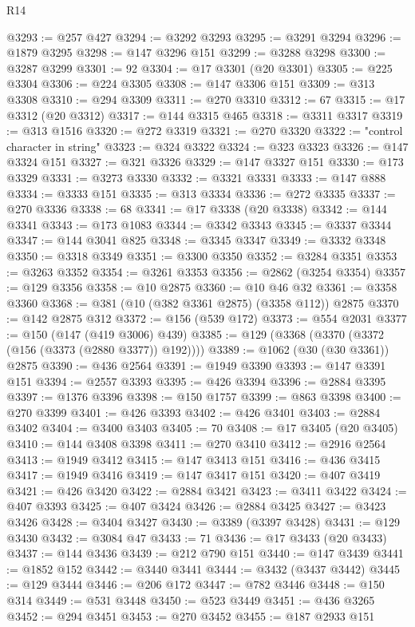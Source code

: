 \begin{lexlean}{R14}
\begin{coremodule}
@3293 := @257 @427
@3294 := @3292 @3293
@3295 := @3291 @3294
@3296 := @1879 @3295
@3298 := @147 @3296 @151
@3299 := @3288 @3298
@3300 := @3287 @3299
@3301 := 92
@3304 := @17 @3301 (@20 @3301)
@3305 := @225 @3304
@3306 := @224 @3305
@3308 := @147 @3306 @151
@3309 := @313 @3308
@3310 := @294 @3309
@3311 := @270 @3310
@3312 := 67
@3315 := @17 @3312 (@20 @3312)
@3317 := @144 @3315 @465
@3318 := @3311 @3317
@3319 := @313 @1516
@3320 := @272 @3319
@3321 := @270 @3320
@3322 := "control character in string"
@3323 := @324 @3322
@3324 := @323 @3323
@3326 := @147 @3324 @151
@3327 := @321 @3326
@3329 := @147 @3327 @151
@3330 := @173 @3329
@3331 := @3273 @3330
@3332 := @3321 @3331
@3333 := @147 @888
@3334 := @3333 @151
@3335 := @313 @3334
@3336 := @272 @3335
@3337 := @270 @3336
@3338 := 68
@3341 := @17 @3338 (@20 @3338)
@3342 := @144 @3341
@3343 := @173 @1083
@3344 := @3342 @3343
@3345 := @3337 @3344
@3347 := @144 @3041 @825
@3348 := @3345 @3347
@3349 := @3332 @3348
@3350 := @3318 @3349
@3351 := @3300 @3350
@3352 := @3284 @3351
@3353 := @3263 @3352
@3354 := @3261 @3353
@3356 := @2862 (@3254 @3354)
@3357 := @129 @3356
@3358 := @10 @2875
@3360 := @10 @46 @32
@3361 := @3358 @3360
@3368 := @381 (@10 (@382 @3361 @2875) (@3358 @112)) @2875
@3370 := @142 @2875 @312
@3372 := @156 (@539 @172)
@3373 := @554 @2031
@3377 := @150 (@147 (@419 @3006) @439)
@3385 := @129 (@3368 (@3370 (@3372 (@156 (@3373 (@2880 @3377)) @192))))
@3389 := @1062 (@30 (@30 @3361)) @2875
@3390 := @436 @2564
@3391 := @1949 @3390
@3393 := @147 @3391 @151
@3394 := @2557 @3393
@3395 := @426 @3394
@3396 := @2884 @3395
@3397 := @1376 @3396
@3398 := @150 @1757
@3399 := @863 @3398
@3400 := @270 @3399
@3401 := @426 @3393
@3402 := @426 @3401
@3403 := @2884 @3402
@3404 := @3400 @3403
@3405 := 70
@3408 := @17 @3405 (@20 @3405)
@3410 := @144 @3408 @3398
@3411 := @270 @3410
@3412 := @2916 @2564
@3413 := @1949 @3412
@3415 := @147 @3413 @151
@3416 := @436 @3415
@3417 := @1949 @3416
@3419 := @147 @3417 @151
@3420 := @407 @3419
@3421 := @426 @3420
@3422 := @2884 @3421
@3423 := @3411 @3422
@3424 := @407 @3393
@3425 := @407 @3424
@3426 := @2884 @3425
@3427 := @3423 @3426
@3428 := @3404 @3427
@3430 := @3389 (@3397 @3428)
@3431 := @129 @3430
@3432 := @3084 @47
@3433 := 71
@3436 := @17 @3433 (@20 @3433)
@3437 := @144 @3436
@3439 := @212 @790 @151
@3440 := @147 @3439
@3441 := @1852 @152
@3442 := @3440 @3441
@3444 := @3432 (@3437 @3442)
@3445 := @129 @3444
@3446 := @206 @172
@3447 := @782 @3446
@3448 := @150 @314
@3449 := @531 @3448
@3450 := @523 @3449
@3451 := @436 @3265
@3452 := @294 @3451
@3453 := @270 @3452
@3455 := @187 @2933 @151

\end{coremodule}
\end{lexlean}
